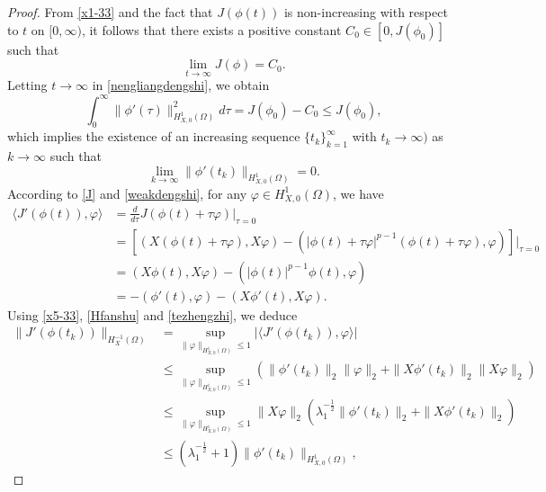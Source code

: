 \documentclass[11pt,a4paper]{article}
\numberwithin{equation}{section}
\numberwithin{remark}{section}
\begin{document}
\begin{proof}
From \eqref{x1-33} and the fact that $J(\phi(t))$ is non-increasing with respect to $t$ on $[0,\infty)$, it follows that there exists a positive constant $C_0\in[0,J(\phi_0)]$ such that
\begin{equation}\label{x2-33}
\lim\limits_{t\rightarrow\infty}J(\phi)=C_0.
\end{equation}
Letting $t\rightarrow\infty$ in \eqref{nengliangdengshi}, we obtain
\begin{equation}\label{x3-33}
\int_0^\infty\|\phi'(\tau)\|_{H_{X,0}^1(\Omega)}^2d\tau=J(\phi_0)-C_0\leq J(\phi_0),
\end{equation}
which implies the existence of an increasing sequence $\{t_k\}_{k=1}^\infty$ with $t_k\rightarrow\infty)$ as $k\rightarrow\infty$ such that
\begin{equation}\label{x4-33}
\lim_{k\rightarrow\infty}\|\phi'(t_k)\|_{H_{X,0}^1(\Omega)}=0.
\end{equation}
According to \eqref{J} and \eqref{weakdengshi}, for any $\varphi\in H_{X,0}^1(\Omega)$, we have
\begin{equation}\label{x5-33}
\begin{split}
\langle J'(\phi(t)),\varphi\rangle&=\frac{d}{d\tau}J(\phi(t)+\tau\varphi)\bigg|_{\tau=0}\\
&=\left[\left(X(\phi(t)+\tau\varphi),X\varphi\right)-\left(|\phi(t)+\tau\varphi|^{p-1}(\phi(t)+\tau\varphi),\varphi\right)\right]\big|_{\tau=0}\\
&=(X\phi(t),X\varphi)-\left(|\phi(t)|^{p-1}\phi(t),\varphi\right)\\
&=-(\phi'(t),\varphi)-(X\phi'(t),X\varphi).
\end{split}
\end{equation}
Using \eqref{x5-33}, \eqref{Hfanshu} and \eqref{tezhengzhi}, we deduce
\begin{equation*}
\begin{split}
\|J'(\phi(t_k))\|_{H_X^{-1}(\Omega)}&=\sup_{\|\varphi\|_{H_{X,0}^1(\Omega)}\leq1}\big|\langle J'(\phi(t_k)),\varphi\rangle\big|\\
&\leq\sup_{\|\varphi\|_{H_{X,0}^1(\Omega)}\leq1}\left(\|\phi'(t_k)\|_2\|\varphi\|_2+\|X\phi'(t_k)\|_2\|X\varphi\|_2\right)\\
&\leq\sup_{\|\varphi\|_{H_{X,0}^1(\Omega)}\leq1}\|X\varphi\|_2\left(\lambda_1^{-\frac{1}{2}}\|\phi'(t_k)\|_2+\|X\phi'(t_k)\|_2\right)\\
&\leq\left(\lambda_1^{-\frac{1}{2}}+1\right)\|\phi'(t_k)\|_{H_{X,0}^1(\Omega)},
\end{split}
\end{equation*}

\end{proof}
\end{document}

